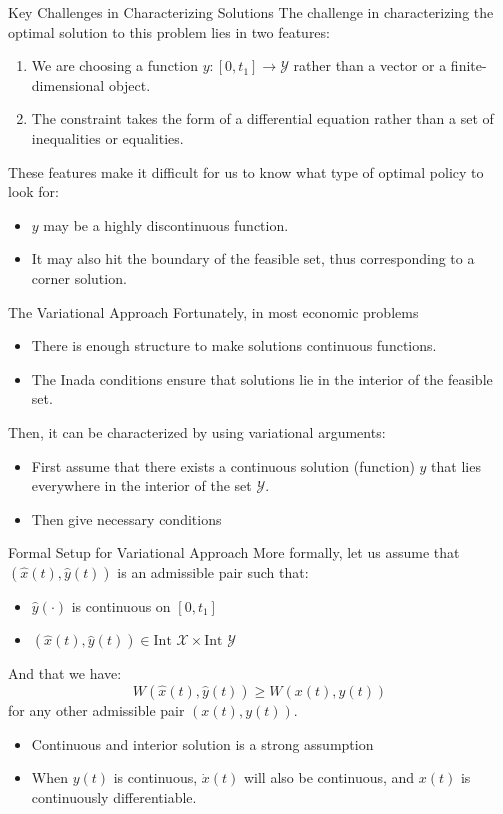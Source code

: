 \documentclass[9pt,aspectratio=169]{beamer}
\newcommand{\X}{\mathcal{X}}
\newcommand{\Y}{\mathcal{Y}}
\begin{document}
\begin{frame}{Key Challenges in Characterizing Solutions}
The challenge in characterizing the optimal solution to this problem lies in two features:
\begin{enumerate}
\item We are choosing a function $y : [0, t_1] \rightarrow \Y$ rather than a vector or a finite-dimensional object.
\item The constraint takes the form of a differential equation rather than a set of inequalities or equalities.
\end{enumerate}

These features make it difficult for us to know what type of optimal policy to look for:
\begin{itemize}
\item $y$ may be a highly discontinuous function.
\item It may also hit the boundary of the feasible set, thus corresponding to
a corner solution.
\end{itemize}
\end{frame}

\begin{frame}{The Variational Approach}
Fortunately, in most economic problems
\begin{itemize}
    \item There is enough structure to make solutions continuous functions.
    \item The Inada conditions ensure that solutions lie in the interior of
    the feasible set.
\end{itemize}
Then, it can be characterized by using variational arguments:
\begin{itemize}
    \item First assume that there exists a continuous solution (function)
    $\hat{y}$ that lies everywhere in the interior of the set $\Y$.
    \item Then give necessary conditions
\end{itemize}
\end{frame}

\begin{frame}{Formal Setup for Variational Approach}
More formally, let us assume that $(\hat{x}(t), \hat{y}(t))$ is an admissible pair such that:
\begin{itemize}
\item $\hat{y}(\cdot)$ is continuous on $[0, t_1]$
\item $(\hat{x}(t), \hat{y}(t)) \in \text{Int } \X \times \text{Int } \Y$
\end{itemize}

And that we have:
$$W(\hat{x}(t), \hat{y}(t)) \geq W(x(t), y(t))$$
for any other admissible pair $(x(t), y(t))$.
\begin{itemize}
    \item Continuous and interior solution is a strong assumption
    \item When $y(t)$ is continuous, $\dot{x}(t)$ will also be continuous,
    and $x(t)$ is continuously differentiable.
\end{itemize}
\end{frame}
\end{document}
